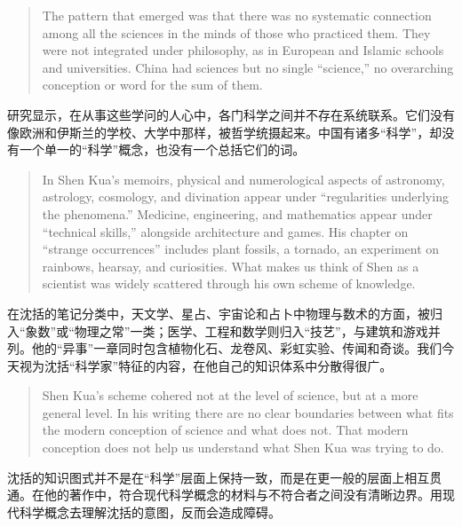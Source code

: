 \documentclass[UTF8,zihao=-4]{ctexart}
\newenvironment{enblock}
  {\par\smallskip\noindent{\scriptsize\bfseries English}\par\begin{quote}\small}
  {\end{quote}}
\newenvironment{zhblock}
  {\par\noindent{\scriptsize\bfseries 中文}\par}
  {\par\medskip}
\begin{document}
\begin{enblock}
The pattern that emerged was that there was no systematic connection among all the sciences in the minds of those who practiced them. They were not integrated under philosophy, as in European and Islamic schools and universities. China had sciences but no single ``science,'' no overarching conception or word for the sum of them.
\end{enblock}
\begin{zhblock}
研究显示，在从事这些学问的人心中，各门科学之间并不存在系统联系。它们没有像欧洲和伊斯兰的学校、大学中那样，被哲学统摄起来。中国有诸多“科学”，却没有一个单一的“科学”概念，也没有一个总括它们的词。
\end{zhblock}

\begin{enblock}
In Shen Kua's memoirs, physical and numerological aspects of astronomy, astrology, cosmology, and divination appear under ``regularities underlying the phenomena.'' Medicine, engineering, and mathematics appear under ``technical skills,'' alongside architecture and games. His chapter on ``strange occurrences'' includes plant fossils, a tornado, an experiment on rainbows, hearsay, and curiosities. What makes us think of Shen as a scientist was widely scattered through his own scheme of knowledge.
\end{enblock}
\begin{zhblock}
在沈括的笔记分类中，天文学、星占、宇宙论和占卜中物理与数术的方面，被归入“象数”或“物理之常”一类；医学、工程和数学则归入“技艺”，与建筑和游戏并列。他的“异事”一章同时包含植物化石、龙卷风、彩虹实验、传闻和奇谈。我们今天视为沈括“科学家”特征的内容，在他自己的知识体系中分散得很广。
\end{zhblock}

\begin{enblock}
Shen Kua's scheme cohered not at the level of science, but at a more general level. In his writing there are no clear boundaries between what fits the modern conception of science and what does not. That modern conception does not help us understand what Shen Kua was trying to do.
\end{enblock}
\begin{zhblock}
沈括的知识图式并不是在“科学”层面上保持一致，而是在更一般的层面上相互贯通。在他的著作中，符合现代科学概念的材料与不符合者之间没有清晰边界。用现代科学概念去理解沈括的意图，反而会造成障碍。
\end{zhblock}
\end{document}

